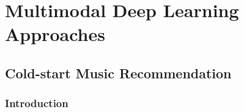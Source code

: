 
\part{Multimodal Deep Learning Approaches}
\label{part:multimodal-deep}

\chapter{Cold-start Music Recommendation}
\label{sec:cold-rec}

\section{Introduction}
\label{sec:cold-rec:introduction}
